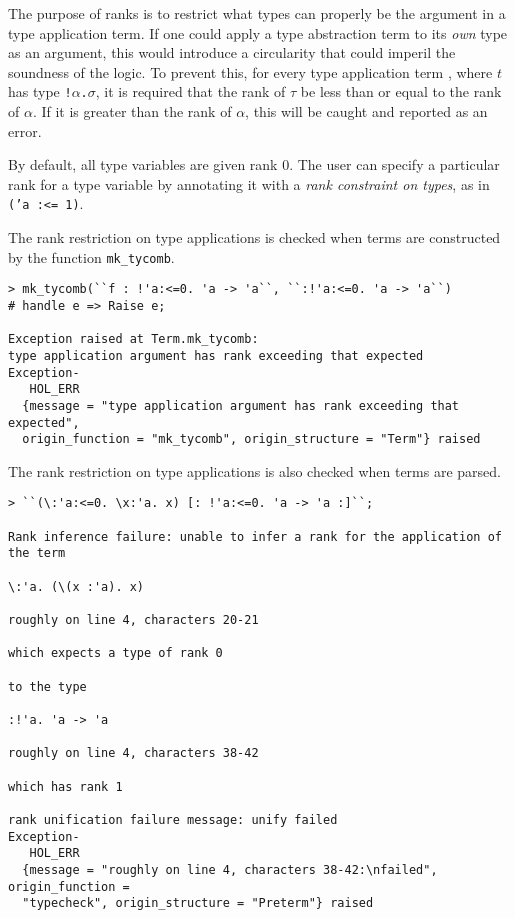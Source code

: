 The purpose of ranks is to restrict what types can properly be
the argument in a type application term.
If one could apply a type abstraction term
to its {\it own\/} type as an argument, this would introduce a circularity that could
imperil the soundness of the logic.
%
To prevent this, for every type application term
, where $t$ has type \texttt{!$\alpha$.$\sigma$},
it is required that the rank of $\tau$ be less than or equal to
the rank of $\alpha$.  If it is greater than the rank of $\alpha$,
this will be
caught and
reported as an error.

By default, all type variables are given rank 0.  The user can specify
a particular rank for a type variable by annotating it with
a {\it rank constraint on types},
as in \texttt{('a :<= 1)}.

The rank restriction on type applications is checked when terms
are constructed by the \ML{} function \texttt{mk\_tycomb}.
%
\begin{session}
\begin{verbatim}
> mk_tycomb(``f : !'a:<=0. 'a -> 'a``, ``:!'a:<=0. 'a -> 'a``)
# handle e => Raise e;

Exception raised at Term.mk_tycomb:
type application argument has rank exceeding that expected
Exception-
   HOL_ERR
  {message = "type application argument has rank exceeding that expected",
  origin_function = "mk_tycomb", origin_structure = "Term"} raised
\end{verbatim}
\end{session}

The rank restriction on type applications is also checked when terms
are parsed.
%
\begin{session}
\begin{verbatim}
> ``(\:'a:<=0. \x:'a. x) [: !'a:<=0. 'a -> 'a :]``;

Rank inference failure: unable to infer a rank for the application of the term

\:'a. (\(x :'a). x)

roughly on line 4, characters 20-21

which expects a type of rank 0

to the type

:!'a. 'a -> 'a

roughly on line 4, characters 38-42

which has rank 1

rank unification failure message: unify failed
Exception-
   HOL_ERR
  {message = "roughly on line 4, characters 38-42:\nfailed", origin_function =
  "typecheck", origin_structure = "Preterm"} raised
\end{verbatim}
\end{session}

